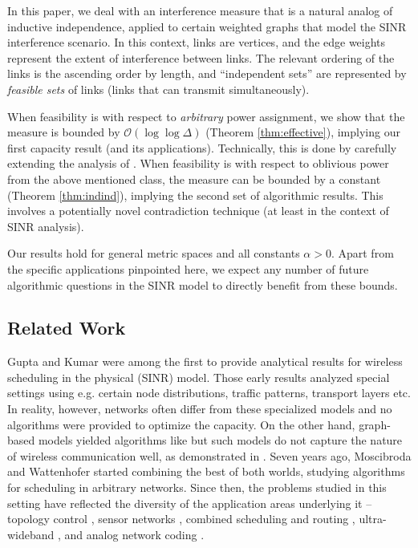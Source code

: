 \documentclass[11pt]{amsart}
\newcommand{\BO}{\mathcal{O}}
\begin{document}
In this paper, we deal with an interference measure that is a natural analog of
inductive independence, applied to certain weighted graphs that model the SINR
interference scenario.
In this context, links are vertices, and the edge weights
represent the extent of interference between links. The relevant ordering
of the links is the ascending order by length, and ``independent sets'' are represented by \emph{feasible sets} of links (links that can transmit simultaneously).


When feasibility is with respect to \emph{arbitrary} power assignment, 
we show that the measure is
bounded by $\BO(\log \log \Delta)$ (Theorem \ref{thm:effective}), implying
our first capacity result (and its applications). Technically, this is
done by carefully extending the analysis of
\cite{us:esa09full}. When feasibility is with respect to oblivious
power from the above mentioned class, the measure can be bounded by
a constant (Theorem \ref{thm:indind}), implying the second set of algorithmic
results. This involves a potentially novel contradiction technique (at least
in the context of SINR analysis).

Our results hold for general metric spaces and all constants $\alpha > 0$.
Apart from the specific applications pinpointed here, we expect any number of
future algorithmic questions in the SINR model to directly benefit
from these bounds. 














\subsection{Related Work}\label{sec:related}
Gupta and Kumar \cite{kumar00} were among the first to provide analytical results for wireless scheduling in the physical (SINR) model. Those early results analyzed special settings using e.g. certain node distributions, traffic patterns, transport layers etc. In reality, however, networks often differ from these specialized models and no algorithms were provided to optimize the capacity. On the other hand, graph-based models yielded algorithms like \cite{parth05,ScheidelerRS08} but such models do not capture the nature of wireless communication well, as demonstrated in \cite{gronkvist01,MaheshwariJD08,Moscibroda2006Protocol}. Seven years ago, Moscibroda and Wattenhofer \cite{MoWa06} started combining the best of both worlds, studying algorithms for scheduling in arbitrary networks. Since then, the problems studied in
this setting have reflected the diversity of the application areas underlying it --  topology control \cite{gao08,stoc_topology11,moscibroda06b}, sensor networks \cite{Moscibroda07},
combined scheduling and routing \cite{chafekar07}, ultra-wideband \cite{HuaL06}, and analog network coding \cite{goussevskaia2008complexity}. 
\end{document}
